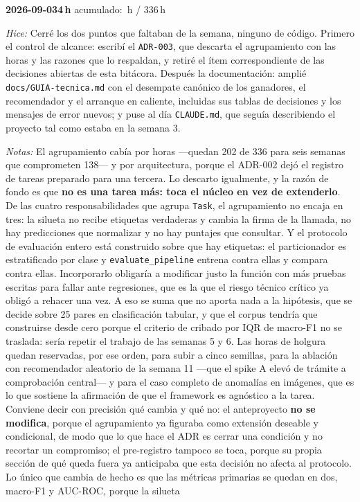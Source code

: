 \documentclass[11pt,letterpaper]{article}
\newcommand{\presupuesto}{336}
\newcommand{\horasacum}{0}
\newcommand{\entrada}[4]{%
  \xdef\horasacum{\fpeval{\horasacum + #2}}%
  \par\medskip
  \noindent\textbf{\color{tecnavy}#1}\quad\textbf{#2\,h}%
  \hfill{\small\color{gris}acumulado: \horasacum\,h / \presupuesto\,h}\par
  \nopagebreak
  \noindent\textit{Hice:} #3\par
  \nopagebreak
  \noindent\textit{Notas:} #4\par
}
\begin{document}
\entrada{2026-09-03}{4}
{Cerré los dos puntos que faltaban de la semana, ninguno de código. Primero el control de
 alcance: escribí el \texttt{ADR-003}, que descarta el agrupamiento con las horas y las
 razones que lo respaldan, y retiré el ítem correspondiente de las decisiones abiertas de
 esta bitácora. Después la documentación: amplié \texttt{docs/GUIA-tecnica.md} con el
 desempate canónico de los ganadores, el recomendador y el arranque en caliente, incluidas
 sus tablas de decisiones y los mensajes de error nuevos; y puse al día
 \texttt{CLAUDE.md}, que seguía describiendo el proyecto tal como estaba en la semana 3.}
{El agrupamiento cabía por horas —quedan 202 de 336 para seis semanas que comprometen
 138— y por arquitectura, porque el ADR-002 dejó el registro de tareas preparado para una
 tercera. Lo descarto igualmente, y la razón de fondo es que \textbf{no es una tarea más:
 toca el núcleo en vez de extenderlo}. De las cuatro responsabilidades que agrupa
 \texttt{Task}, el agrupamiento no encaja en tres: la silueta no recibe etiquetas
 verdaderas y cambia la firma de la llamada, no hay predicciones que normalizar y no hay
 puntajes que consultar. Y el protocolo de evaluación entero está construido sobre que hay
 etiquetas: el particionador es estratificado por clase y \texttt{evaluate\_pipeline}
 entrena contra ellas y compara contra ellas. Incorporarlo obligaría a modificar justo la
 función con más pruebas escritas para fallar ante regresiones, que es la que el riesgo
 técnico crítico ya obligó a rehacer una vez. A eso se suma que no aporta nada a la
 hipótesis, que se decide sobre 25 pares en clasificación tabular, y que el corpus tendría
 que construirse desde cero porque el criterio de cribado por IQR de macro-F1 no se
 traslada: sería repetir el trabajo de las semanas 5 y 6. Las horas de holgura quedan
 reservadas, por ese orden, para subir a cinco semillas, para la ablación con recomendador
 aleatorio de la semana 11 —que el spike A elevó de trámite a comprobación central— y para
 el caso completo de anomalías en imágenes, que es lo que sostiene la afirmación de que el
 framework es agnóstico a la tarea. Conviene decir con precisión qué cambia y qué no: el
 anteproyecto \textbf{no se modifica}, porque el agrupamiento ya figuraba como extensión
 deseable y condicional, de modo que lo que hace el ADR es cerrar una condición y no
 recortar un compromiso; el pre-registro tampoco se toca, porque su propia sección de qué
 queda fuera ya anticipaba que esta decisión no afecta al protocolo. Lo único que cambia de
 hecho es que las métricas primarias se quedan en dos, macro-F1 y AUC-ROC, porque la silueta
}
\end{document}
